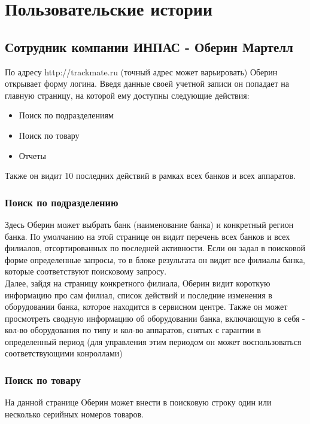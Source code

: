 \documentclass[DIV=calc, paper=a4, fontsize=11pt]{scrartcl} %
\begin{document}
\section{Пользовательские истории}

\begin{framed}
\subsection{Сотрудник компании ИНПАС - Оберин Мартелл}
По адресу http://trackmate.ru (точный адрес может варьировать) Оберин открывает форму логина. Введя данные своей учетной записи он попадает на главную страницу, на которой ему доступны следующие действия:
\begin{itemize}
	\item Поиск по подразделениям
	\item Поиск по товару
	\item Отчеты
\end{itemize} 	
Также он видит 10 последних действий в рамках всех банков и всех аппаратов.

\subsubsection{Поиск по подразделению}
Здесь Оберин может выбрать банк (наименование банка) и конкретный регион банка. По умолчанию на этой странице он видит перечень всех банков и всех филиалов, отсортированных по последней активности. Если он задал в поисковой форме определенные запросы, то в блоке результата он видит все филиалы банка, которые соответствуют поисковому запросу.
\\[0.5cm]
Далее, зайдя на страницу конкретного филиала, Оберин видит короткую информацию про сам филиал, список действий и последние изменения в оборудовании банка, которое находится в сервисном центре.
Также он может просмотреть сводную информацию об оборудовании банка, включающую в себя - кол-во оборудования по типу и кол-во аппаратов, снятых с гарантии в определенный период (для управления этим периодом он может воспользоваться соответствующими конроллами)

\subsubsection{Поиск по товару}
На данной странице Оберин может внести в поисковую строку один или несколько серийных номеров товаров.
\end{framed}
\end{document}
